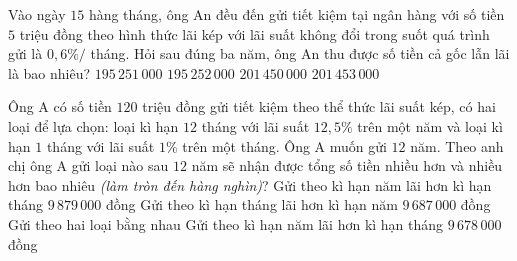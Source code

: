 \begin{ex}%
	Vào ngày $ 15$ hàng tháng, ông An đều đến gửi tiết kiệm tại ngân hàng với số tiền $ 5$ triệu đồng theo hình thức lãi kép với lãi suất không đổi trong suốt quá trình gửi là $ 0{,}6\%  /$ tháng. Hỏi sau đúng ba năm, ông An thu được số tiền cả gốc lẫn lãi là bao nhiêu?
	\choice 
		{$  195\,251\,000$}
		{$  195\,252\,000$}
		{$  201\,450\,000$}
		{\True $ 201\,453\,000$} 
\end{ex}

\begin{ex}%
	Ông A có số tiền $120$ triệu đồng gửi tiết kiệm theo thể thức lãi suất kép, có hai loại để lựa chọn: loại kì hạn $12$ tháng với lãi suất $12{,}5\%$ trên một năm và loại kì hạn $1$ tháng với  lãi suất $1\%$ trên một tháng. Ông A muốn gửi $12$ năm. Theo anh chị ông A gửi loại nào sau $12$ năm sẽ nhận được tổng số tiền nhiều hơn và nhiều hơn bao nhiêu \textit{(làm tròn đến hàng nghìn)}?
	 \choice
		{Gửi theo kì hạn năm  lãi hơn kì hạn tháng $9\,879\,000$ đồng}
		{\True Gửi theo kì hạn tháng lãi hơn kì hạn năm  $9\,687\,000$ đồng}
		{Gửi theo hai  loại bằng nhau}
		{Gửi theo kì hạn năm lãi hơn  kì hạn tháng $9\,678\,000$ đồng}
\end{ex}

